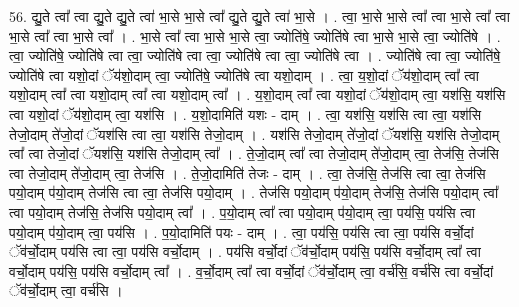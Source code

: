 \documentclass[17pt]{extarticle}
\begin{document}
56. द्यु॒ते त्वा᳚ त्वा द्यु॒ते द्यु॒ते त्वा॑ भा॒से भा॒से त्वा᳚ द्यु॒ते द्यु॒ते त्वा॑ भा॒से । . त्वा॒ भा॒से भा॒से त्वा᳚ त्वा भा॒से त्वा᳚ त्वा भा॒से त्वा᳚ त्वा भा॒से त्वा᳚ । . भा॒से त्वा᳚ त्वा भा॒से भा॒से त्वा॒ ज्योति॑षे॒ ज्योति॑षे त्वा भा॒से भा॒से त्वा॒ ज्योति॑षे । . त्वा॒ ज्योति॑षे॒ ज्योति॑षे त्वा त्वा॒ ज्योति॑षे त्वा त्वा॒ ज्योति॑षे त्वा त्वा॒ ज्योति॑षे त्वा । . ज्योति॑षे त्वा त्वा॒ ज्योति॑षे॒ ज्योति॑षे त्वा यशो॒दां ॅय॑शो॒दाम् त्वा॒ ज्योति॑षे॒ ज्योति॑षे त्वा यशो॒दाम् । . त्वा॒ य॒शो॒दां ॅय॑शो॒दाम् त्वा᳚ त्वा यशो॒दाम् त्वा᳚ त्वा यशो॒दाम् त्वा᳚ त्वा यशो॒दाम् त्वा᳚ । . य॒शो॒दाम् त्वा᳚ त्वा यशो॒दां ॅय॑शो॒दाम् त्वा॒ यश॑सि॒ यश॑सि त्वा यशो॒दां ॅय॑शो॒दाम् त्वा॒ यश॑सि । . य॒शो॒दामिति॑ यशः - दाम् । . त्वा॒ यश॑सि॒ यश॑सि त्वा त्वा॒ यश॑सि तेजो॒दाम् ते॑जो॒दां ॅयश॑सि त्वा त्वा॒ यश॑सि तेजो॒दाम् । . यश॑सि तेजो॒दाम् ते॑जो॒दां ॅयश॑सि॒ यश॑सि तेजो॒दाम् त्वा᳚ त्वा तेजो॒दां ॅयश॑सि॒ यश॑सि तेजो॒दाम् त्वा᳚ । . ते॒जो॒दाम् त्वा᳚ त्वा तेजो॒दाम् ते॑जो॒दाम् त्वा॒ तेज॑सि॒ तेज॑सि त्वा तेजो॒दाम् ते॑जो॒दाम् त्वा॒ तेज॑सि । . ते॒जो॒दामिति॑ तेजः - दाम् । . त्वा॒ तेज॑सि॒ तेज॑सि त्वा त्वा॒ तेज॑सि पयो॒दाम् प॑यो॒दाम् तेज॑सि त्वा त्वा॒ तेज॑सि पयो॒दाम् । . तेज॑सि पयो॒दाम् प॑यो॒दाम् तेज॑सि॒ तेज॑सि पयो॒दाम् त्वा᳚ त्वा पयो॒दाम् तेज॑सि॒ तेज॑सि पयो॒दाम् त्वा᳚ । . प॒यो॒दाम् त्वा᳚ त्वा पयो॒दाम् प॑यो॒दाम् त्वा॒ पय॑सि॒ पय॑सि त्वा पयो॒दाम् प॑यो॒दाम् त्वा॒ पय॑सि । . प॒यो॒दामिति॑ पयः - दाम् । . त्वा॒ पय॑सि॒ पय॑सि त्वा त्वा॒ पय॑सि वर्चो॒दां ॅव॑र्चो॒दाम् पय॑सि त्वा त्वा॒ पय॑सि वर्चो॒दाम् । . पय॑सि वर्चो॒दां ॅव॑र्चो॒दाम् पय॑सि॒ पय॑सि वर्चो॒दाम् त्वा᳚ त्वा वर्चो॒दाम् पय॑सि॒ पय॑सि वर्चो॒दाम् त्वा᳚ । . व॒र्चो॒दाम् त्वा᳚ त्वा वर्चो॒दां ॅव॑र्चो॒दाम् त्वा॒ वर्च॑सि॒ वर्च॑सि त्वा वर्चो॒दां ॅव॑र्चो॒दाम् त्वा॒ वर्च॑सि । \newline
\end{document}
